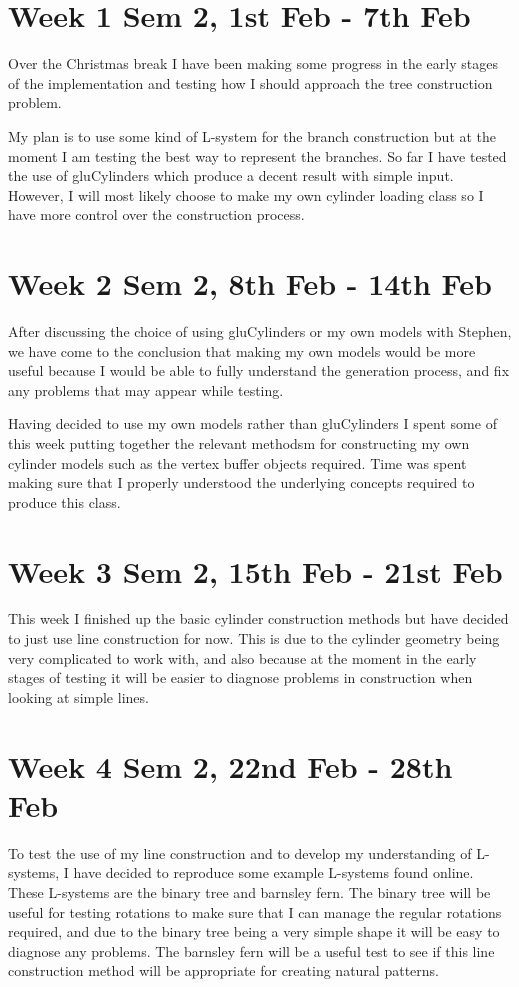 \documentclass[11pt]{article}
\begin{document}
\section*{Week 1 Sem 2, 1st Feb - 7th Feb}
Over the Christmas break I have been making some progress in the early stages of the implementation 
and testing how I should approach the tree construction problem. 

My plan is to use some kind of L-system for the branch construction but at the moment I am 
testing the best way to represent the branches. So far I have tested the use of gluCylinders 
which produce a decent result with simple input. However, I will most likely choose to make my 
own cylinder loading class so I have more control over the construction process. 

\section*{Week 2 Sem 2, 8th Feb - 14th Feb}
After discussing the choice of using gluCylinders or my own models with Stephen, we have come 
to the conclusion that making my own models would be more useful because I would be able to 
fully understand the generation process, and fix any problems that may appear while testing.

Having decided to use my own models rather than gluCylinders I spent some of this week putting 
together the relevant methodsm for constructing my own cylinder models such as the vertex 
buffer objects required. Time was spent making sure that I properly understood the underlying 
concepts required to produce this class. 

\section*{Week 3 Sem 2, 15th Feb - 21st Feb}
This week I finished up the basic cylinder construction methods but have decided to just use 
line construction for now. This is due to the cylinder geometry being very complicated to work 
with, and also because at the moment in the early stages of testing it will be easier to diagnose 
problems in construction when looking at simple lines. 

\section*{Week 4 Sem 2, 22nd Feb - 28th Feb}
To test the use of my line construction and to develop my understanding of L-systems, I have 
decided to reproduce some example L-systems found online. These L-systems are the binary tree 
and barnsley fern. The binary tree will be useful for testing rotations to make sure that I 
can manage the regular rotations required, and due to the binary tree being a very simple shape 
it will be easy to diagnose any problems. The barnsley fern will be a useful test to see if 
this line construction method will be appropriate for creating natural patterns. 
\end{document}
